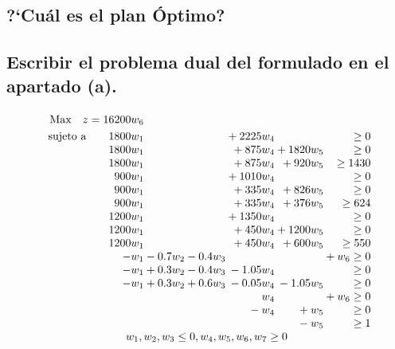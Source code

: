 \documentclass[10pt, a4paper]{article}
\begin{document}
		\subsection{?`Cuál es el plan Óptimo?}

			\paragraph{}


		\subsection{Escribir el problema dual del formulado en el apartado (a).}

			\paragraph{}

			\[
			  \begin{array}{r@{}r@{}r@{}r@{}r@{}r@{}l}
			    \text{Max} \quad z = 16200w_{6} \\[\jot]
			    \text{sujeto a}\qquad 	1800w_{1} 	&{} 		&{} 		&{} +2225w_{4} 	&{} 			&{}			\geq 0 \\
			                     		1800w_{1} 	&{} 		&{} 		&{} +875w_{4}	&{} +1820w_{5}	&{}			\geq 0 \\
								 		1800w_{1} 	&{} 		&{} 		&{} +875w_{4}	&{} +920w_{5}	&{} 		\geq 1430 \\
								 		900w_{1}  	&{} 		&{} 		&{} +1010w_{4}	&{} 			&{}     	\geq 0  \\
								 		900w_{1}  	&{} 		&{} 		&{} +335w_{4}	&{} +826w_{5}	&{}  		\geq 0 \\
										900w_{1}    &{} 		&{} 		&{} +335w_{4} 	&{} +376w_{5}	&{}  		\geq 624 \\
										1200w_{1}   &{}  		&{} 		&{} +1350w_{4}	&{} 			&{}  		\geq 0 \\
										1200w_{1}   &{}  		&{} 		&{} +450w_{4}	&{} +1200w_{5}	&{} 		\geq 0 \\
										1200w_{1}  	&{} 		&{} 	 	&{} +450w_{4}	&{} +600w_{5}	&{} 		\geq 550 \\
										-w_{1}		&{}-0.7 w_{2}&{}-0.4w_{3}&{} 			&{} 			&{} + w_{6} \geq 0 \\
										-w_{1}		&{}+0.3 w_{2}&{}-0.4w_{3}&{}-1.05w_{4} 	&{} 			&{} 		\geq 0 \\
										-w_{1}		&{}+0.3 w_{2}&{}+0.6w_{3}&{}-0.05w_{4} 	&{} -1.05w_{5}	&{} 		\geq 0 \\
													&{} 		&{} 	 	&{}w_{4} 		&{} 			&{} + w_{6}	\geq 0 \\
													&{} 		&{}  		&{}-w_{4} 	 	&{} +w_{5}		&{}			\geq 0 \\
													&{} 		&{}  		&{} 			&{} -w_{5}		&{}			\geq 1 \\
			     \multicolumn{6}{c}{w_{1}, w_{2}, w_{3} \leq 0, w_{4}, w_{5}, w_{6}, w_{7} \geq 0}


			  \end{array}
			\]
\end{document}
